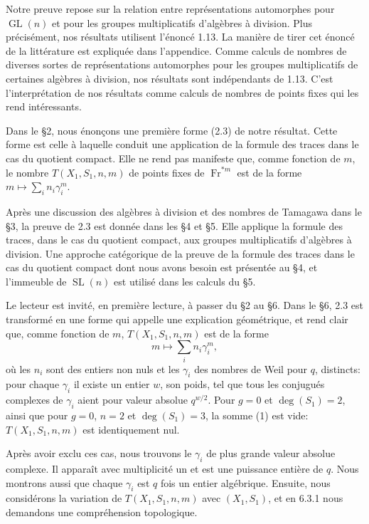 \documentclass[10pt]{article}
\newcommand{\GL}{\operatorname{GL}}
\newcommand{\SL}{\operatorname{SL}}
\newcommand{\Fr}{\operatorname{Fr}}
\theoremstyle{deligne}
\begin{document}
Notre preuve repose sur la relation entre représentations automorphes pour $\GL(n)$ et pour les groupes multiplicatifs d'algèbres à division. Plus précisément, nos résultats utilisent l'énoncé 1.13. La manière de tirer cet énoncé de la littérature est expliquée dans l'appendice. Comme calculs de nombres de diverses sortes de représentations automorphes pour les groupes multiplicatifs de certaines algèbres à division, nos résultats sont indépendants de 1.13. C'est l'interprétation de nos résultats comme calculs de nombres de points fixes qui les rend intéressants.

Dans le \S2, nous énonçons une première forme (2.3) de notre résultat. Cette forme est celle à laquelle conduit une application de la formule des traces dans le cas du quotient compact. Elle ne rend pas manifeste que, comme fonction de $m$, le nombre $T(X_1,S_1,n,m)$ de points fixes de $\Fr^{*m}$ est de la forme $m\mapsto\sum_i n_i\gamma_i^m$.

Après une discussion des algèbres à division et des nombres de Tamagawa dans le \S3, la preuve de 2.3 est donnée dans les \S4 et \S5. Elle applique la formule des traces, dans le cas du quotient compact, aux groupes multiplicatifs d'algèbres à division. Une approche catégorique de la preuve de la formule des traces dans le cas du quotient compact dont nous avons besoin est présentée au \S4, et l'immeuble de $\SL(n)$ est utilisé dans les calculs du \S5.

Le lecteur est invité, en première lecture, à passer du \S2 au \S6. Dans le \S6, 2.3 est transformé en une forme qui appelle une explication géométrique, et rend clair que, comme fonction de $m$, $T(X_1,S_1,n,m)$ est de la forme
\begin{equation}\tag{1}
 m\longmapsto \sum_i n_i\gamma_i^m,
\end{equation}
où les $n_i$ sont des entiers non nuls et les $\gamma_i$ des nombres de Weil pour $q$, distincts: pour chaque $\gamma_i$ il existe un entier $w$, son poids, tel que tous les conjugués complexes de $\gamma_i$ aient pour valeur absolue $q^{w/2}$. Pour $g=0$ et $\deg(S_1)=2$, ainsi que pour $g=0$, $n=2$ et $\deg(S_1)=3$, la somme (1) est vide: $T(X_1,S_1,n,m)$ est identiquement nul.

Après avoir exclu ces cas, nous trouvons le $\gamma_i$ de plus grande valeur absolue complexe. Il apparaît avec multiplicité un et est une puissance entière de $q$. Nous montrons aussi que chaque $\gamma_i$ est $q$ fois un entier algébrique. Ensuite, nous considérons la variation de $T(X_1,S_1,n,m)$ avec $(X_1,S_1)$, et en 6.3.1 nous demandons une compréhension topologique.
\end{document}
